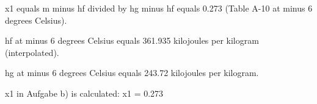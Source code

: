 x1 equals m minus hf divided by hg minus hf equals 0.273 (Table A-10 at minus 6 degrees Celsius).

hf at minus 6 degrees Celsius equals 361.935 kilojoules per kilogram (interpolated).

hg at minus 6 degrees Celsius equals 243.72 kilojoules per kilogram.

x1 in Aufgabe b) is calculated:  
x1 = 0.273